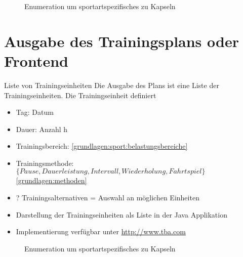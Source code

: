 \begin{figure}[h]
    \centering
    \caption{Enumeration um sportartspezifisches zu Kapseln}
    \label{fig:uml:enumeration}
\end{figure}

\section{Ausgabe des Trainingsplans oder Frontend}
Liste von Trainingseinheiten
\label{sec:modellierung:output}
Die Ausgabe des Plans ist eine Liste der Trainingseinheiten. Die Trainingseinheit definiert 
\begin{itemize}
    \item Tag: Datum
    \item Dauer: Anzahl h
    \item Trainingsbereich: \ref{grundlagen:sport:belastungsbereiche}
    \item Trainingsmethode: $\{Pause, Dauerleistung, Intervall, Wiederholung, Fahrtspiel\}$ \ref{grundlagen:methoden}
    \item ? Trainingsalternativen = Auswahl an möglichen Einheiten
\end{itemize}

\begin{itemize}
    \item Darstellung der Trainingseinheiten als Liste in der Java Applikation
    \item Implementierung verfügbar unter \url{http://www.tba.com}
\end{itemize}

\begin{figure}[h]
    \caption{Enumeration um sportartspezifisches zu Kapseln}
    \label{fig:uml:solver}
\end{figure}

